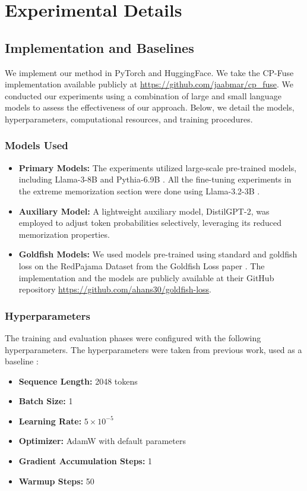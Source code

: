 \section{Experimental Details}
\subsection{Implementation and Baselines}
\label{appendix:baselines}
We implement our method in PyTorch and HuggingFace. We take the CP-Fuse implementation available publicly at \url{https://github.com/jaabmar/cp_fuse}. We conducted our experiments using a combination of large and small language models to assess the effectiveness of our approach. Below, we detail the models, hyperparameters, computational resources, and training procedures.

\subsubsection{Models Used}
\begin{itemize}
    \item \textbf{Primary Models:} The experiments utilized large-scale pre-trained models, including Llama-3-8B \cite{dubey2024llama} and Pythia-6.9B \cite{biderman2023pythiasuiteanalyzinglarge}. All the fine-tuning experiments in the extreme memorization section were done using Llama-3.2-3B \cite{dubey2024llama}. 
    \item \textbf{Auxiliary Model:} A lightweight auxiliary model, DistilGPT-2, was employed to adjust token probabilities selectively, leveraging its reduced memorization properties.
    \item  \textbf{Goldfish Models:} We used models pre-trained using standard and goldfish loss on the RedPajama Dataset from the Goldfish Loss paper \cite{hans2024like}. The implementation and the models are publicly available at their GitHub repository \url{https://github.com/ahans30/goldfish-loss}.
\end{itemize}

\subsubsection{Hyperparameters}
The training and evaluation phases were configured with the following hyperparameters. The hyperparameters were taken from previous work, used as a baseline \cite{abad2024copyright}:
\begin{itemize}
    \item \textbf{Sequence Length:} 2048 tokens
    \item \textbf{Batch Size:} 1
    \item \textbf{Learning Rate:} $5 \times 10^{-5}$
    \item \textbf{Optimizer:} AdamW with default parameters
    \item \textbf{Gradient Accumulation Steps:} 1
    \item \textbf{Warmup Steps:} 50
\end{itemize}

